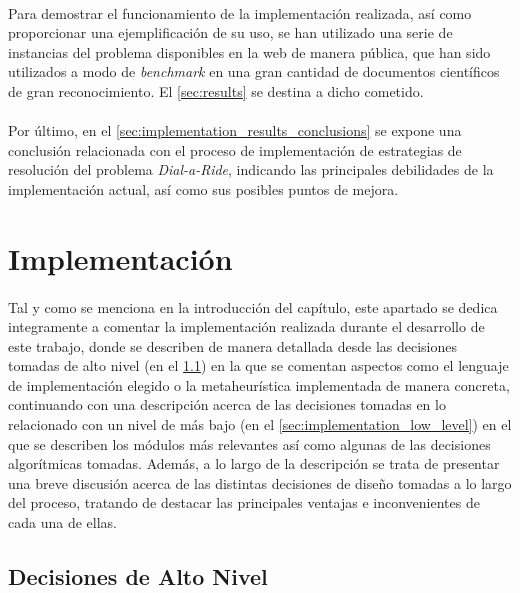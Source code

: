 \documentclass{subfiles}
\begin{document}
      \paragraph{}
      Para demostrar el funcionamiento de la implementación realizada, así como proporcionar una ejemplificación de su uso, se han utilizado una serie de instancias del problema disponibles en la web de manera pública, que han sido utilizados a modo de \emph{benchmark} en una gran cantidad de documentos científicos de gran reconocimiento. El \cref{sec:results} se destina a dicho cometido. 
      
      \paragraph{}
      Por último, en el \cref{sec:implementation_results_conclusions} se expone una conclusión relacionada con el proceso de implementación de estrategias de resolución del problema \emph{Dial-a-Ride}, indicando las principales debilidades de la implementación actual, así como sus posibles puntos de mejora.

    \section{Implementación}
    \label{sec:implementation}
      
      \paragraph{}
      Tal y como se menciona en la introducción del capítulo, este apartado se dedica integramente a comentar la implementación realizada durante el desarrollo de este trabajo, donde se describen de manera detallada desde las decisiones tomadas de alto nivel (en el \cref{sec:implementation_high_level}) en la que se comentan aspectos como el lenguaje de implementación elegido o la metaheurística implementada de manera concreta, continuando con una descripción acerca de las decisiones tomadas en lo relacionado con un nivel de más bajo (en el \cref{sec:implementation_low_level}) en el que se describen los módulos más relevantes así como algunas de las decisiones algorítmicas tomadas. Además, a lo largo de la descripción se trata de presentar una breve discusión acerca de las distintas decisiones de diseño tomadas a lo largo del proceso, tratando de destacar las principales ventajas e inconvenientes de cada una de ellas.

      \subsection{Decisiones de Alto Nivel}
      \label{sec:implementation_high_level}
\end{document}
